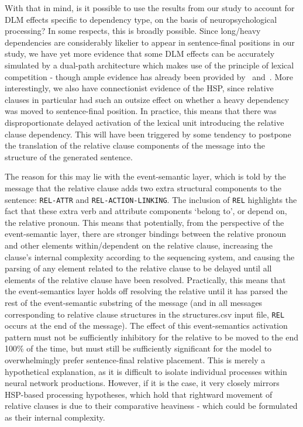 \documentclass{article}
\begin{document}
With that in mind, is it possible to use the results from our study to account for DLM effects specific to dependency type, on the basis of neuropsychological processing? In some respects, this is broadly possible. Since long/heavy dependencies are considerably likelier to appear in sentence-final positions in our study, we have yet more evidence that some DLM effects can be accurately simulated by a dual-path architecture which makes use of the principle of lexical competition - though ample evidence has already been provided by~\cite{chang2009} and~\cite{chang2014}. More interestingly, we also have connectionist evidence of the HSP, since relative clauses in particular had such an outsize effect on whether a heavy dependency was moved to sentence-final position. In practice, this means that there was disproportionate delayed activation of the lexical unit introducing the relative clause dependency. This will have been triggered by some tendency to postpone the translation of the relative clause components of the message into the structure of the generated sentence. 

The reason for this may lie with the event-semantic layer, which is told by the message that the relative clause adds two extra structural components to the sentence: \texttt{REL-ATTR} and \texttt{REL-ACTION-LINKING}. The inclusion of \texttt{REL} highlights the fact that these extra verb and attribute components `belong to', or depend on, the relative pronoun. This means that potentially, from the perspective of the event-semantic layer, there are stronger bindings between the relative pronoun and other elements within/dependent on the relative clause, increasing the clause's internal complexity according to the sequencing system, and causing the parsing of any element related to the relative clause to be delayed until all elements of the relative clause have been resolved. Practically, this means that the event-semantics layer holds off resolving the relative until it has parsed the rest of the event-semantic substring of the message (and in all messages corresponding to relative clause structures in the structures.csv input file, \texttt{REL} occurs at the end of the message). The effect of this event-semantics activation pattern must not be sufficiently inhibitory for the relative to be moved to the end 100\% of the time, but must still be sufficiently significant for the model to overwhelmingly prefer sentence-final relative placement. This is merely a hypothetical explanation, as it is difficult to isolate individual processes within neural network productions. However, if it is the case, it very closely mirrors HSP-based processing hypotheses, which hold that rightward movement of relative clauses is due to their comparative heaviness - which could be formulated as their internal complexity.  
\end{document}
